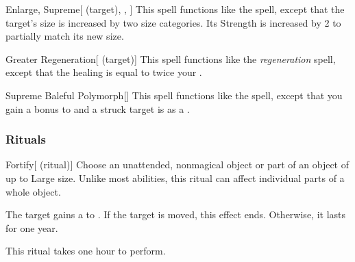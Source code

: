 \lowercase{\hypertarget{spell:Enlarge, Supreme}{}}\label{spell:Enlarge, Supreme}
\begin{attuneability}[\nth{7}]{\hypertarget{spell:Enlarge, Supreme}{Enlarge, Supreme}}[ (target), , ]
This spell functions like the  spell, except that the target's size is increased by two size categories.
Its Strength is increased by 2 to partially match its new size.
\end{attuneability}
\vspace{0.25em}



\lowercase{\hypertarget{spell:Greater Regeneration}{}}\label{spell:Greater Regeneration}
\begin{attuneability}[\nth{7}]{\hypertarget{spell:Greater Regeneration}{Greater Regeneration}}[ (target)]
This spell functions like the \textit{regeneration} spell, except that the healing is equal to twice your .
\end{attuneability}
\vspace{0.25em}



\lowercase{\hypertarget{spell:Supreme Baleful Polymorph}{}}\label{spell:Supreme Baleful Polymorph}
\begin{apability}[\nth{7}]{\hypertarget{spell:Supreme Baleful Polymorph}{Supreme Baleful Polymorph}}[]
This spell functions like the  spell, except that you gain a  bonus to  and a struck target is  as a .
\end{apability}
\vspace{0.25em}



\subsubsection{Rituals}


\lowercase{\hypertarget{spell:Fortify}{}}\label{spell:Fortify}
\begin{attuneability}[\nth{1}]{\hypertarget{spell:Fortify}{Fortify}}[ (ritual)]
Choose an unattended, nonmagical object or part of an object of up to Large size.
Unlike most abilities, this ritual can affect individual parts of a whole object.

The target gains a   to .
If the target is moved, this effect ends.
Otherwise, it lasts for one year.

This ritual takes one hour to perform.
\end{attuneability}
\vspace{0.25em}



